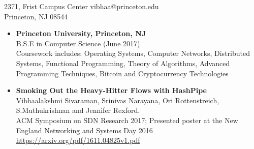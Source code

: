 \documentclass[margin]{res}
\begin{document}
 


\begin{resume} 
\hspace*{-\hoffset} 2371, Frist Campus Center \hfill  vibhaa@princeton.edu \\
\hspace*{-\hoffset} Princeton, NJ 08544\\ %

 

\begin{itemize}
\section{Education} 

\item
\textbf{Princeton University, Princeton, NJ\\}
B.S.E in Computer Science (June 2017) \\
Coursework includes: Operating Systems, Computer Networks, Distributed Systems, Functional Programming, Theory of Algorithms, Advanced Programming Techniques, Bitcoin and Cryptocurrency Technologies
\end{itemize}

\begin{itemize}
\section{Publications}
\item
\textbf{Smoking Out the Heavy-Hitter Flows with HashPipe} \\
Vibhaalakshmi Sivaraman, Srinivas Narayana, Ori Rottenstreich,  S.Muthukrishnan and Jennifer Rexford.\\
ACM Symposium on SDN Research 2017; Presented poster at the New England Networking and Systems Day 2016 \\ %
\url{https://arxiv.org/pdf/1611.04825v1.pdf}


\end{itemize}
\end{resume}
\end{document}
